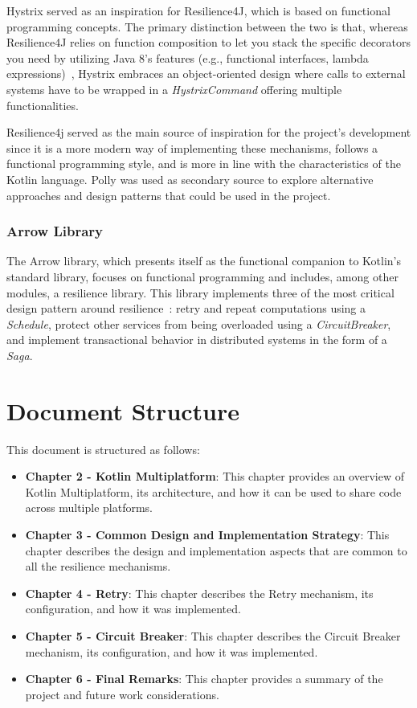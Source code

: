 Hystrix served as an inspiration for Resilience4J, which is based on functional programming concepts.
The primary distinction between the two is that, whereas Resilience4J relies on function composition to let you stack the specific decorators you need by utilizing Java 8's features (e.g., functional interfaces, lambda expressions)~\cite{resilience4j-vs-hystrix}, Hystrix embraces an object-oriented design where calls to external systems have to be wrapped in a \textit{HystrixCommand} offering multiple functionalities.

Resilience4j served as the main source of inspiration for the project's development since it is a more modern way of implementing these mechanisms, follows a functional programming style, and is more in line with the characteristics of the Kotlin language.
Polly was used as secondary source to explore alternative approaches and design patterns that could be used in the project.

\subsubsection{Arrow Library}

The Arrow library, which presents itself as the functional companion to Kotlin's standard library, focuses on functional programming and includes, among other modules, a resilience library.
This library implements three of the most critical design pattern around resilience~\cite{arrow-resilience}: retry and repeat computations using a \textit{Schedule}, protect other services from being overloaded using a \textit{CircuitBreaker}, and implement transactional behavior in distributed systems in the form of a \textit{Saga}.

\section{Document Structure}\label{sec:document-structure}

This document is structured as follows:

\begin{itemize}
    \item \textbf{Chapter 2 - Kotlin Multiplatform}: This chapter provides an overview of Kotlin Multiplatform, its architecture, and how it can be used to share code across multiple platforms.
    \item \textbf{Chapter 3 - Common Design and Implementation Strategy}: This chapter describes the design and implementation aspects that are common to all the resilience mechanisms.
    \item \textbf{Chapter 4 - Retry}: This chapter describes the Retry mechanism, its configuration, and how it was implemented.
    \item \textbf{Chapter 5 - Circuit Breaker}: This chapter describes the Circuit Breaker mechanism, its configuration, and how it was implemented.
    \item \textbf{Chapter 6 - Final Remarks}: This chapter provides a summary of the project and future work considerations.
\end{itemize}
